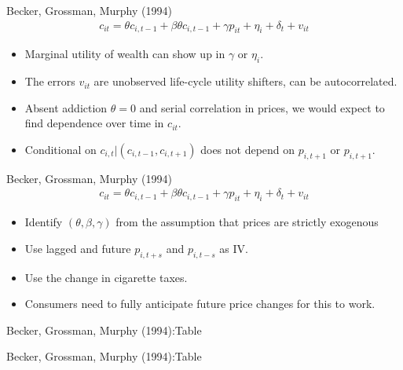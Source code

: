 \documentclass[aspectratio=169]{beamer}
\begin{document}
\begin{frame}{Becker, Grossman, Murphy (1994)}
\begin{align*}
c_{it} = \theta c_{i,t-1} +\beta \theta c_{i,t-1} + \gamma p_{it} + \eta_{i} + \delta_t + v_{it}
\end{align*}
\begin{itemize}
\item Marginal utility of wealth can show up in $\gamma$ or $\eta_i$.
\item The errors $v_{it}$ are unobserved life-cycle utility shifters, can be autocorrelated. 
\item Absent addiction $\theta=0$ and serial correlation in prices, we would expect to find dependence over time in $c_{it}$.
\item Conditional on $c_{i,t}| (c_{i,t-1},c_{i,t+1})$ does not depend on $p_{i,t+1}$ or $p_{i,t+1}$.
\end{itemize}
\end{frame}


\begin{frame}{Becker, Grossman, Murphy (1994)}
\begin{align*}
c_{it} = \theta c_{i,t-1} +\beta \theta c_{i,t-1} + \gamma p_{it} + \eta_{i} + \delta_t + v_{it}
\end{align*}
\begin{itemize}
\item Identify $(\theta,\beta,\gamma)$ from the assumption that prices are strictly exogenous
\item Use lagged and future $p_{i,t+s}$ and $p_{i,t-s}$ as IV. 
\item Use the change in cigarette taxes.
\item Consumers need to fully anticipate \alert{future price changes} for this to work.
\end{itemize}
\end{frame}

\begin{frame}{Becker, Grossman, Murphy (1994):Table}
\end{frame}

\begin{frame}{Becker, Grossman, Murphy (1994):Table}
\end{frame}
\end{document}
